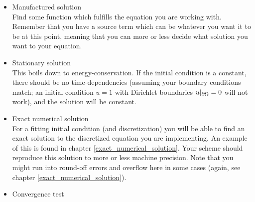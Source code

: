 \begin{itemize}
 \item Manufactured solution\\
 Find some function which fulfills the equation you are working with. Remember that you have a source term which can be whatever you want it to be at this point, meaning that you can more or less decide what solution you want to your equation. 
 \item Stationary solution\\
 This boils down to energy-conservation. If the initial condition is a constant, there should be no time-dependencies (assuming your boundary conditions match; an initial condition $u=1$ with Dirichlet boundaries $u|_{\partial \Omega}=0$ will not work), and the solution will be constant.
 \item Exact numerical solution\\
 For a fitting initial condition (and discretization) you will be able to find an exact solution to the discretized equation you are implementing. An example of this is found in chapter \ref{exact_numerical_solution}. Your scheme should reproduce this solution to more or less machine precision. Note that you might run into round-off errors and overflow here in some cases (again, see chapter \ref{exact_numerical_solution}).\\
 \item Convergence test\\
 
\end{itemize}
